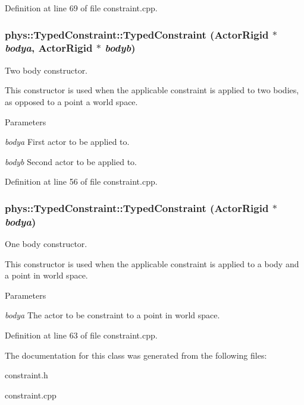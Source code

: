 Definition at line 69 of file constraint.cpp.

\hypertarget{classphys_1_1TypedConstraint_a50ca8631a6c75bbc609c8d4ed61fdcee}{
\subsubsection[{TypedConstraint}]{\setlength{\rightskip}{0pt plus 5cm}phys::TypedConstraint::TypedConstraint ({\bf ActorRigid} $\ast$ {\em bodya}, \/  {\bf ActorRigid} $\ast$ {\em bodyb})}}
\label{d1/d17/classphys_1_1TypedConstraint_a50ca8631a6c75bbc609c8d4ed61fdcee}


Two body constructor. 

This constructor is used when the applicable constraint is applied to two bodies, as opposed to a point a world space. 
\begin{DoxyParams}{Parameters}
\item[{\em bodya}]First actor to be applied to. \item[{\em bodyb}]Second actor to be applied to. \end{DoxyParams}


Definition at line 56 of file constraint.cpp.

\hypertarget{classphys_1_1TypedConstraint_a41ad08bfde377e91f2b37b0af40a9d34}{
\subsubsection[{TypedConstraint}]{\setlength{\rightskip}{0pt plus 5cm}phys::TypedConstraint::TypedConstraint ({\bf ActorRigid} $\ast$ {\em bodya})}}
\label{d1/d17/classphys_1_1TypedConstraint_a41ad08bfde377e91f2b37b0af40a9d34}


One body constructor. 

This constructor is used when the applicable constraint is applied to a body and a point in world space. 
\begin{DoxyParams}{Parameters}
\item[{\em bodya}]The actor to be constraint to a point in world space. \end{DoxyParams}


Definition at line 63 of file constraint.cpp.



The documentation for this class was generated from the following files:\begin{DoxyCompactItemize}
\item 
constraint.h\item 
constraint.cpp\end{DoxyCompactItemize}
